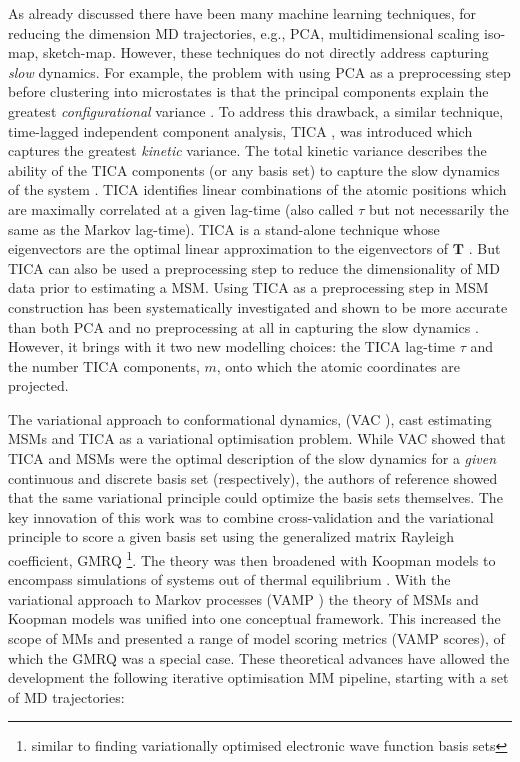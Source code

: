 As already discussed there have been many  machine learning techniques, for reducing the dimension MD trajectories, e.g., PCA, multidimensional scaling iso-map, sketch-map. However,  these techniques do not directly address capturing \emph{slow} dynamics. For example, the problem with using PCA as a preprocessing step before clustering into microstates is that the principal components explain the greatest \emph{configurational} variance \cite{perez-hernandezIdentificationSlowMolecular2013a}. To address this drawback, a similar technique, time-lagged independent component analysis, TICA \cite{perez-hernandezIdentificationSlowMolecular2013a, schwantesImprovementsMarkovState2013}, was introduced which captures the greatest \emph{kinetic} variance. The total kinetic variance describes the ability of the TICA components (or any basis set) to capture the slow dynamics of the system \cite{noeKineticDistanceKinetic2015}.  TICA identifies linear combinations of the atomic positions which are maximally correlated at a given lag-time (also called $\tau$ but not necessarily the same as the Markov lag-time). TICA is a stand-alone technique whose eigenvectors are the optimal linear approximation to the eigenvectors of $\mathbf{T}$ \cite{nuskeVariationalApproachMolecular2014}. But TICA can also be used a preprocessing step to reduce the dimensionality of MD data prior to estimating a MSM.  Using TICA as a preprocessing step in MSM construction has been systematically investigated and shown to be more accurate than both PCA and no preprocessing at all in capturing the slow dynamics \cite{husicOptimizedParameterSelection2016}. However, it brings with it two new modelling choices: the TICA lag-time $\tau$ and the number TICA components, $m$, onto which the atomic coordinates are projected. 


The variational approach to conformational dynamics, (VAC \cite{nuskeVariationalApproachMolecular2014}), cast estimating MSMs and TICA as a variational optimisation problem. While VAC showed that TICA and MSMs were the optimal description of the slow dynamics for a \emph{given} continuous and discrete basis set (respectively), the authors of reference \cite{mcgibbonVariationalCrossvalidationSlow2015} showed that the same variational principle could optimize the basis sets themselves. The key innovation of this work was to combine cross-validation \cite{arlotSurveyCrossvalidationProcedures2009} and the variational principle to score a given basis set using the generalized matrix Rayleigh coefficient, GMRQ \footnote{similar to finding variationally optimised electronic wave function basis sets}. The theory was then broadened with Koopman models to encompass simulations of systems out of thermal equilibrium \cite{wuVariationalKoopmanModels2017}. With the variational approach to Markov processes (VAMP \cite{wuVariationalApproachLearning2020c}) the theory of MSMs and Koopman models was unified into one conceptual framework. This increased the scope of MMs and presented a range of model scoring metrics (VAMP scores), of which the GMRQ was a special case. These theoretical advances have allowed the development the following iterative optimisation MM pipeline, starting with a set of MD trajectories:


